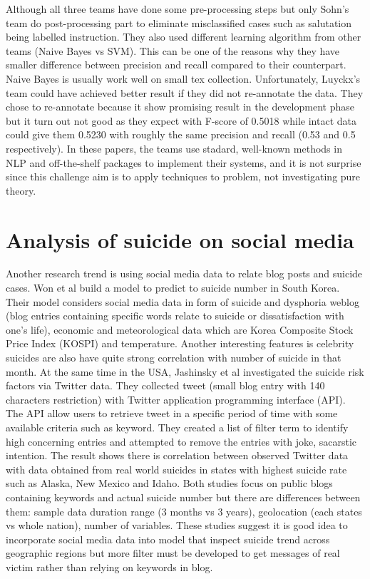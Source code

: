 Although all three teams have done some pre-processing steps but only Sohn’s team do post-processing part to eliminate misclassified cases such as salutation being labelled instruction. They also used different learning algorithm from other teams (Naive Bayes vs SVM). This can be one of the reasons why they have smaller difference between precision and recall compared to their counterpart. Naive Bayes is usually work well on small tex collection. Unfortunately, Luyckx’s team could have achieved better result if they did not re-annotate the data. They chose to re-annotate because it show promising result in the development phase but it turn out not good as they expect with F-score of 0.5018 while intact data could give them 0.5230 with roughly the same precision and recall (0.53 and 0.5 respectively). In these papers, the teams use stadard, well-known methods in NLP and off-the-shelf packages to implement their systems, and it is not surprise since this challenge aim is to apply techniques to problem, not investigating pure theory.


\section{Analysis of suicide on social media}
Another research trend is using social media data to relate blog posts and suicide cases. Won et al \cite{Won2013} build a model to predict to suicide number in South Korea. Their model considers social media data in form of suicide and dysphoria weblog (blog entries containing specific words relate to suicide or dissatisfaction with one’s life), economic and meteorological data which are Korea Composite Stock Price Index (KOSPI) and temperature. Another interesting features is celebrity suicides are also have quite strong correlation with number of suicide in that month. At the same time in the USA, Jashinsky et al \cite{Jashinsky2014}  investigated the suicide risk factors via Twitter data. They collected tweet (small blog entry with 140 characters restriction) with Twitter application programming interface (API). The API allow users to retrieve tweet in a specific period of time with some available criteria such as keyword. They created a list of filter term to identify high concerning entries and attempted to remove the entries with joke, sacarstic intention. The result shows there is correlation between observed Twitter data with data obtained from real world suicides in states with highest suicide rate such as Alaska, New Mexico and Idaho. Both studies focus on public blogs containing keywords and actual suicide number but there are differences between them: sample data duration range (3 months vs 3 years), geolocation (each states vs whole nation), number of variables. These studies suggest it is good idea to incorporate social media data into model that inspect suicide trend across geographic regions but more filter must be developed to get messages of real victim rather than relying on keywords in blog.


